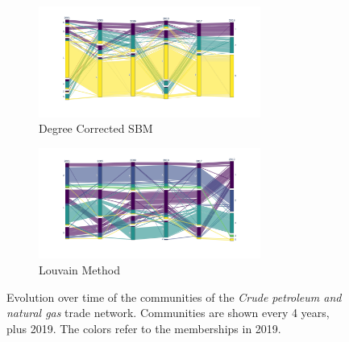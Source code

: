 \begin{figure}
    \centering
    \begin{subfigure}{\textwidth}
        \centering
        \includegraphics[width=0.8\textwidth]{pics/dc_p06.png}
        \caption{Degree Corrected SBM}
        \label{fig:dcgas}
    \end{subfigure}
    \begin{subfigure}{\textwidth}
        \centering
        \includegraphics[width=0.8\textwidth]{pics/lou_p06.png}
        \caption{Louvain Method}
        \label{fig:lougas}
    \end{subfigure}
    \caption[Evolution over time of the communities of the \textit{Crude petroleum and natural gas} trade network.]{Evolution over time of the communities of the \textit{Crude petroleum and natural gas} trade network. Communities are shown every 4 years, plus 2019. The colors refer to the memberships in 2019.}
    \label{fig:commgas}
\end{figure}


